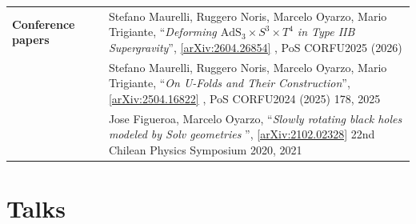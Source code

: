 \documentclass[11pt]{article}
\newenvironment{cvblock}[3]
{
\noindent
\begin{longtable}{p{#1}  >{\raggedright\arraybackslash}p{#2} p{#3}}
}
{
\end{longtable}
}
\newcommand{\cventry}[3]{\textbf{#1} & #2 & #3 \\ }
\newcommand{\paper}[4]{\small #2, “\textit{#1}”, \href{https://arxiv.org/abs/#3}{[arXiv:#3]} #4 \vspace{0.2cm}}
\begin{document}
\begin{cvblock}{1.8cm}{0cm}{13cm}
	\cventry{Conference papers}{}{\paper{Deforming $\mathrm{AdS}_3 \times S^3 \times T^4$ in Type IIB Supergravity}{Stefano Maurelli, Ruggero Noris, Marcelo Oyarzo, Mario Trigiante}{2604.26854}{, PoS CORFU2025 (2026)} }

	\cventry{}{}{\paper{On U-Folds and Their Construction}{Stefano Maurelli, Ruggero Noris, Marcelo Oyarzo, Mario Trigiante}{2504.16822}{, PoS CORFU2024 (2025) 178, 2025} }

	\cventry{}{}{\paper{Slowly rotating black holes modeled by Solv geometries }{Jose Figueroa, Marcelo Oyarzo}{2102.02328}{22nd Chilean Physics Symposium 2020, 2021}}
\end{cvblock}

\section*{Talks}
\end{document}
